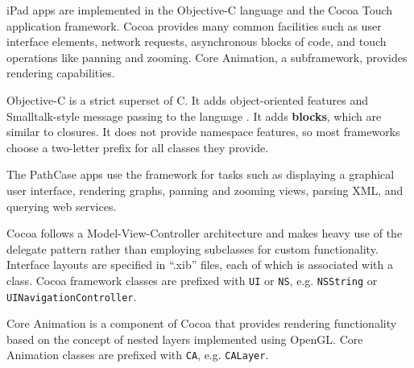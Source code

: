 iPad apps are implemented in the Objective-C language and the Cocoa Touch
application framework.  Cocoa provides many common facilities such as user
interface elements, network requests, asynchronous blocks of code, and touch
operations like panning and zooming. Core Animation, a subframework, provides
rendering capabilities.

Objective-C is a strict superset of C. It adds object-oriented features and
Smalltalk-style message passing to the language \cite{???}. It adds
\textbf{blocks}, which are similar to closures. It does not provide namespace
features, so most frameworks choose a two-letter prefix for all classes they
provide.

The PathCase apps use the framework for tasks such as displaying a graphical
user interface, rendering graphs, panning and zooming views, parsing XML, and
querying web services.

Cocoa follows a Model-View-Controller architecture and makes heavy use of the
delegate pattern rather than employing subclasses for custom functionality.
Interface layouts are specified in ``.xib'' files, each of which is associated
with a class. \cite{ios:application-programming-guide} Cocoa framework classes
are prefixed with \texttt{UI} or \texttt{NS}, e.g. \texttt{NSString} or
\texttt{UINavigationController}.

Core Animation is a component of Cocoa that provides rendering functionality
based on the concept of nested layers implemented using OpenGL.
\cite{ios:core-animation} Core Animation classes are prefixed with \texttt{CA},
e.g. \texttt{CALayer}.
